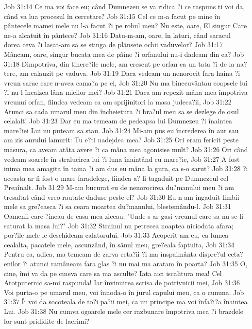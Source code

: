 Job 31:14  Ce ma voi face eu; când Dumnezeu se va ridica ?i ce raspuns ti voi da, când va lua procesul în cercetare?
Job 31:15  Cel ce m-a facut pe mine în pântecele mamei mele nu l-a facut ?i pe robul meu? Nu este, oare, El singur Care ne-a alcatuit în pântece?
Job 31:16  Datu-m-am, oare, în laturi, când saracul dorea ceva ?i lasat-am sa se stinga de plânsete ochii vaduvelor?
Job 31:17  Mâncam, oare, singur bucata mea de pâine ?i orfanului nu-i dadeam din ea?
Job 31:18  Dimpotriva, din tinere?ile mele, am crescut pe orfan ca un tata ?i de la na?tere, am calauzit pe vaduva.
Job 31:19  Daca vedeam un nenorocit fara haina ?i vreun sarac care n-avea cama?a pe el,
Job 31:20  Nu ma binecuvântau coapsele lui ?i nu-l încalzea lâna mieilor mei?
Job 31:21  Daca am repezit mâna mea împotriva vreunui orfan, fiindca vedeam ca am sprijinitori la masa judeca?ii,
Job 31:22  Atunci sa cada umarul meu din încheietura ?i bra?ul meu sa se dezlege de osul celalalt!
Job 31:23  Dar eu ma temeam de pedeapsa lui Dumnezeu ?i înaintea mare?iei Lui nu puteam sa stau.
Job 31:24  Mi-am pus eu încrederea în aur sau am zis aurului lamurit: Tu e?ti nadejdea mea?
Job 31:25  Ori eram fericit peste masura, ca aveam atâta avere ?i ca mâna mea agonisise mult?
Job 31:26  Ori când vedeam soarele în stralucirea lui ?i luna înaintând cu mare?ie,
Job 31:27  A fost inima mea amagita în taina ?i am dus eu mâna la gura, ca s-o sarut?
Job 31:28  ?i aceasta ar fi fost o mare faradelege, fiindca a? fi tagaduit pe Dumnezeul cel Preaînalt.
Job 31:29  M-am bucurat eu de nenorocirea du?manului meu ?i am tresaltat când vreo rautate daduse peste el?
Job 31:30  Eu n-am îngaduit limbii mele sa gre?easca ?i sa ceara moartea du?manului, blestemându-l.
Job 31:31  Oamenii care ?ineau de casa mea ziceau: "Unde s-ar gasi vreunul care sa nu se fi saturat la masa lui?"
Job 31:32  Strainul nu petrecea noaptea niciodata afara; por?ile mele le deschideam calatorului.
Job 31:33  Acoperit-am eu, ca lumea cealalta, pacatele mele, ascunzând, în sânul meu, gre?eala faptuita,
Job 31:34  Pentru ca, adica, ma temeam de zarva ceta?ii ?i ma înspaimânta dispre?ul ceta?enilor ?i atunci ramâneam fara glas ?i nu mai ma aratam în poarta?
Job 31:35  O, cine, îmi va da pe cineva care sa ma asculte? Iata aici iscalitura mea! Cel Atotputernic sa-mi raspunda! Iar învinuirea scrisa de potrivnicii mei,
Job 31:36  Voi purta-o pe umarul meu, voi înnoda-o în jurul capului meu, ca o cununa.
Job 31:37  Îi voi da socoteala de to?i pa?ii mei, ca un principe ma voi înfa?i?a înaintea Lui.
Job 31:38  Nu cumva ogoarele mele cer razbunare împotriva mea ?i brazdele lor sunt prididite de lacrimi?
